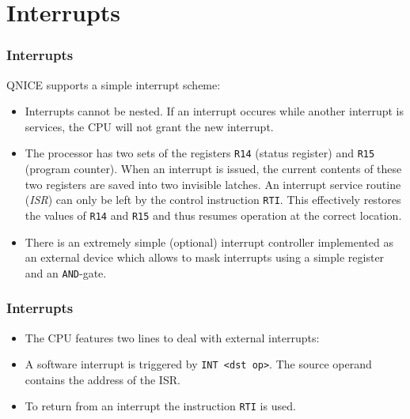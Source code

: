 \documentclass{beamer}
\begin{document}
 \section{Interrupts}
  \begin{frame}
   \frametitle{Interrupts}
   QNICE supports a simple interrupt scheme:
   \begin{itemize}
    \item Interrupts cannot be nested. If an interrupt occures while another
     interrupt is services, the CPU will not grant the new interrupt.
    \item The processor has two sets of the registers \texttt{R14} (status
     register) and \texttt{R15} (program counter). When an interrupt is 
     issued, the current contents of these two registers are saved into two
     invisible latches. An interrupt service routine (\emph{ISR}) can only
     be left by the control instruction \texttt{RTI}. This effectively
     restores the values of \texttt{R14} and \texttt{R15} and thus resumes 
     operation at the correct location.
    \item There is an extremely simple (optional) interrupt controller 
     implemented as an external device which allows to mask interrupts
     using a simple register and an \texttt{AND}-gate.
   \end{itemize}
  \end{frame}
%
  \begin{frame}
   \frametitle{Interrupts}
   \begin{itemize}
    \item The CPU features two lines to deal with external interrupts:
    \item A software interrupt is triggered by \texttt{INT <dst op>}.
     The source operand contains the address of the ISR.
    \item To return from an interrupt the instruction \texttt{RTI} is
     used.
   \end{itemize}
  \end{frame}
\end{document}
